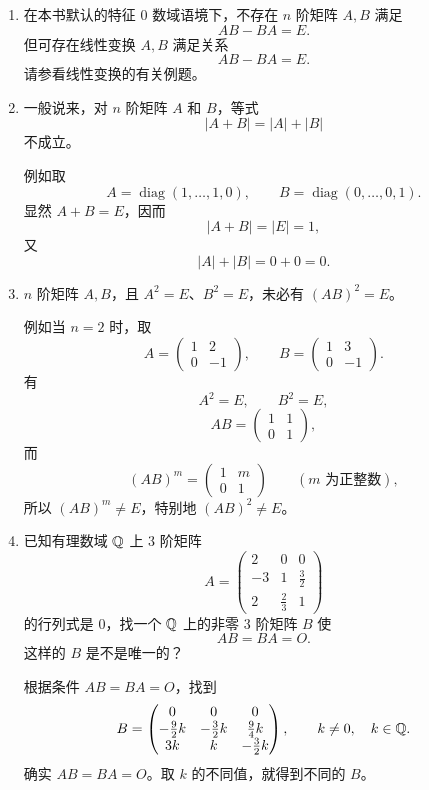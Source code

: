 \begin{enumerate}
\item 在本书默认的特征 $0$ 数域语境下，不存在 $n$ 阶矩阵 $A,B$ 满足
\[
 AB-BA=E.
\]
但可存在线性变换 $A,B$ 满足关系
\[
 AB-BA=E.
\]
请参看线性变换的有关例题。

\item 一般说来，对 $n$ 阶矩阵 $A$ 和 $B$，等式
\[
 |A+B|=|A|+|B|
\]
不成立。

例如取
\[
 A=\operatorname{diag}(1,\ldots,1,0),\qquad
 B=\operatorname{diag}(0,\ldots,0,1).
\]
显然 $A+B=E$，因而
\[
 |A+B|=|E|=1,
\]
又
\[
 |A|+|B|=0+0=0.
\]

\item $n$ 阶矩阵 $A,B$，且 $A^2=E$、$B^2=E$，未必有 $(AB)^2=E$。

例如当 $n=2$ 时，取
\[
 A=\begin{pmatrix}1&2\\0&-1\end{pmatrix},\qquad
 B=\begin{pmatrix}1&3\\0&-1\end{pmatrix}.
\]
有
\[
 A^2=E,\qquad B^2=E,
\]
\[
 AB=\begin{pmatrix}1&1\\0&1\end{pmatrix},
\]
而
\[
 (AB)^m=\begin{pmatrix}1&m\\0&1\end{pmatrix}\qquad(m\text{ 为正整数}),
\]
所以 $(AB)^m\ne E$，特别地 $(AB)^2\ne E$。

\item 已知有理数域 $\mathbb{Q}$ 上 3 阶矩阵
\[
 A=\begin{pmatrix}
 2&0&0\\
 -3&1&\frac32\\
 2&\frac23&1
 \end{pmatrix}
\]
的行列式是 0，找一个 $\mathbb{Q}$ 上的非零 3 阶矩阵 $B$ 使
\[
 AB=BA=O.
\]
这样的 $B$ 是不是唯一的？

根据条件 $AB=BA=O$，找到
\[
 B=\begin{pmatrix}
 0&0&0\\
 -\frac92k&-\frac32k&\frac94k\\
 3k&k&-\frac32k
 \end{pmatrix},
\qquad k\ne0,\quad k\in\mathbb{Q}.
\]
确实 $AB=BA=O$。取 $k$ 的不同值，就得到不同的 $B$。
\end{enumerate}

